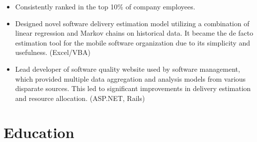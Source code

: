 \documentclass[11pt,a4paper,roman]{moderncv}
\begin{document}
\begin{itemize}
\item Consistently ranked in the top 10\% of company employees.
  \item Designed novel software delivery estimation model utilizing a combination of linear regression and Markov chains
        on historical data. It became the de facto estimation tool for the mobile software organization due to its
        simplicity and usefulness. (Excel/VBA)
  \item Lead developer of software quality website used by software management, which provided multiple data aggregation
        and analysis models from various disparate sources. This led to significant improvements in delivery estimation
        and resource allocation. (ASP.NET, Rails)
\end{itemize}

\section{Education}
\end{document}
